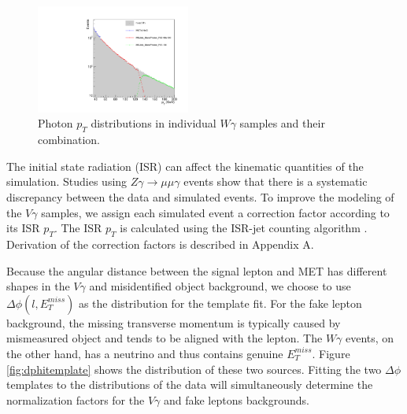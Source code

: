 \documentclass[thesis.tex]{subfiles}
\renewcommand\_{\textunderscore\allowbreak}
\begin{document}
\begin{figure}[hbtp]
  \centering
    \includegraphics[width=0.45\textwidth]{Figures/WGMixing.pdf}
  \caption{Photon $p_T$ distributions in individual $W\gamma$ samples and their combination.}
    \label{fig:mixWG}
\end{figure}

The initial state radiation (ISR) can affect the kinematic quantities of the simulation. Studies using $Z\gamma\rightarrow\mu\mu\gamma$ events show that there is a systematic discrepancy between the data and simulated events. To improve the modeling of the $V\gamma$ samples, we assign each simulated event a correction factor according to its ISR $p_T$. The ISR $p_T$ is calculated using the ISR-jet counting algorithm \cite{ISR-JET-ALGO}. Derivation of the correction factors is described in Appendix A. 

Because the angular distance between the signal lepton and MET has different shapes in the $V\gamma$ and misidentified object background, we choose to use $\Delta\phi(l,E_{T}^{miss})$ as the distribution for the template fit. For the fake lepton background, the missing transverse momentum is typically caused by mismeasured object and tends to be aligned with the lepton. The $W\gamma$ events, on the other hand, has a neutrino and thus contains genuine $E_{T}^{miss}$. Figure \ref{fig:dphitemplate} shows the distribution of these two sources. Fitting the two $\Delta\phi$ templates to the distributions of the data will simultaneously determine the normalization factors for the $V\gamma$ and fake leptons backgrounds. 
\end{document}
